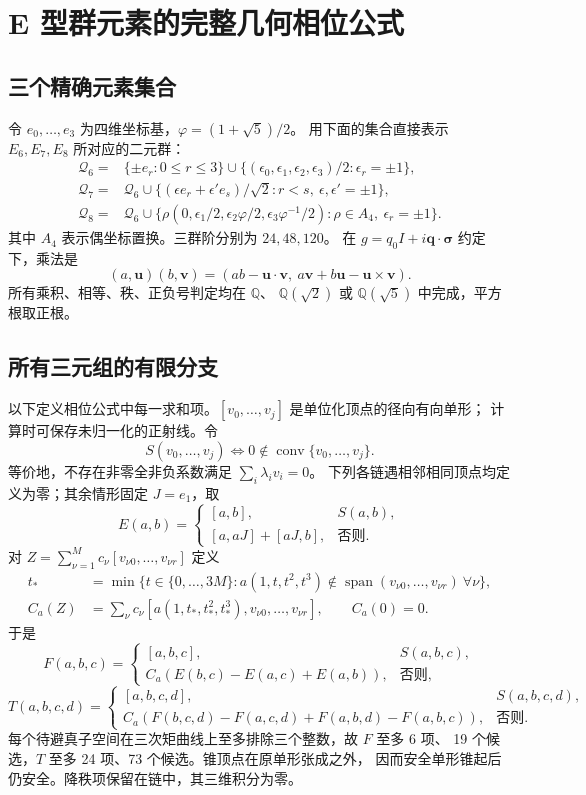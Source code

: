 \section{E 型群元素的完整几何相位公式}\label{sec:E-explicit}

\subsection{三个精确元素集合}
令 $e_0,\ldots,e_3$ 为四维坐标基，$\varphi=(1+\sqrt5)/2$。
用下面的集合直接表示 $E_6,E_7,E_8$ 所对应的二元群：
\begin{align*}
\mathcal Q_6={}&\{\pm e_r:0\le r\le3\}
\cup\{(\epsilon_0,\epsilon_1,\epsilon_2,\epsilon_3)/2:\epsilon_r=\pm1\},\\
\mathcal Q_7={}&\mathcal Q_6\cup
\{(\epsilon e_r+\epsilon'e_s)/\sqrt2:r<s,\ \epsilon,\epsilon'=\pm1\},\\
\mathcal Q_8={}&\mathcal Q_6\cup
\{\rho(0,\epsilon_1/2,\epsilon_2\varphi/2,\epsilon_3\varphi^{-1}/2):
\rho\in A_4,\ \epsilon_r=\pm1\}.
\end{align*}
其中 $A_4$ 表示偶坐标置换。三群阶分别为 $24,48,120$。
在 $g=q_0I+i\mathbf q\cdot\boldsymbol\sigma$ 约定下，乘法是
\[
(a,\mathbf u)(b,\mathbf v)
=(ab-\mathbf u\cdot\mathbf v,\ a\mathbf v+b\mathbf u-\mathbf u\times\mathbf v).
\]
所有乘积、相等、秩、正负号判定均在 $\mathbb Q$、
$\mathbb Q(\sqrt2)$ 或 $\mathbb Q(\sqrt5)$ 中完成，平方根取正根。

\subsection{所有三元组的有限分支}
以下定义相位公式中每一求和项。$[v_0,\ldots,v_j]$ 是单位化顶点的径向有向单形；
计算时可保存未归一化的正射线。令
\[
S(v_0,\ldots,v_j)\iff0\notin\operatorname{conv}\{v_0,\ldots,v_j\}.
\]
等价地，不存在非零全非负系数满足 $\sum_i\lambda_iv_i=0$。
下列各链遇相邻相同顶点均定义为零；其余情形固定 $J=e_1$，取
\[
E(a,b)=\begin{cases}[a,b],&S(a,b),\\
[a,aJ]+[aJ,b],&\text{否则}.
\end{cases}
\]
对 $Z=\sum_{\nu=1}^M c_\nu[v_{\nu0},\ldots,v_{\nu r}]$ 定义
\begin{align*}
t_*&=\min\{t\in\{0,\ldots,3M\}:a(1,t,t^2,t^3)
\notin\operatorname{span}(v_{\nu0},\ldots,v_{\nu r})\ \forall\nu\},\\
C_a(Z)&=\sum_\nu c_\nu[a(1,t_*,t_*^2,t_*^3),v_{\nu0},\ldots,v_{\nu r}],
\qquad C_a(0)=0.
\end{align*}
于是
\[
F(a,b,c)=\begin{cases}[a,b,c],&S(a,b,c),\\
C_a(E(b,c)-E(a,c)+E(a,b)),&\text{否则},\end{cases}
\]
\[
T(a,b,c,d)=\begin{cases}[a,b,c,d],&S(a,b,c,d),\\
C_a(F(b,c,d)-F(a,c,d)+F(a,b,d)-F(a,b,c)),&\text{否则}.
\end{cases}
\]
每个待避真子空间在三次矩曲线上至多排除三个整数，故 $F$ 至多 6 项、
19 个候选，$T$ 至多 24 项、73 个候选。锥顶点在原单形张成之外，
因而安全单形锥起后仍安全。降秩项保留在链中，其三维积分为零。

